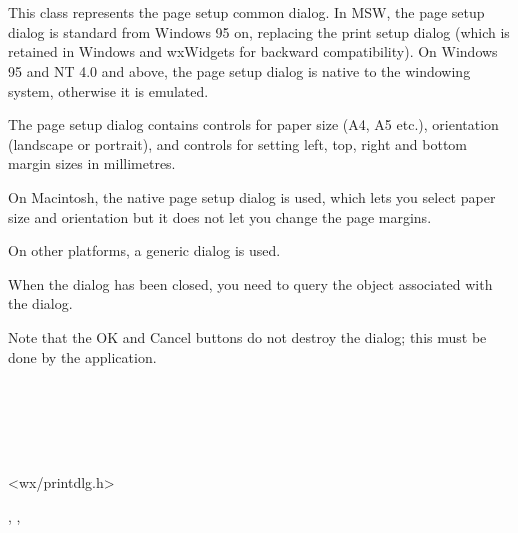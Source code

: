 \section{}\label{wxpagesetupdialog}

This class represents the page setup common dialog. In MSW, the page setup
dialog is standard from Windows 95 on, replacing the print setup dialog (which
is retained in Windows and wxWidgets for backward compatibility). On Windows 95
and NT 4.0 and above, the page setup dialog is native to the windowing system,
otherwise it is emulated.

The page setup dialog contains controls for paper size (A4, A5 etc.),
orientation (landscape or portrait), and controls for setting left, top, right
and bottom margin sizes in millimetres.

On Macintosh, the native page setup dialog is used, which lets you select paper
size and orientation but it does not let you change the page margins.

On other platforms, a generic dialog is used.

When the dialog has been closed, you need to query the
 object associated with
the dialog.

Note that the OK and Cancel buttons do not destroy the dialog; this must be done
by the application.


\\
\\
\\
\\


<wx/printdlg.h>




, 
, 


\label{wxpagesetupdialogctor}

